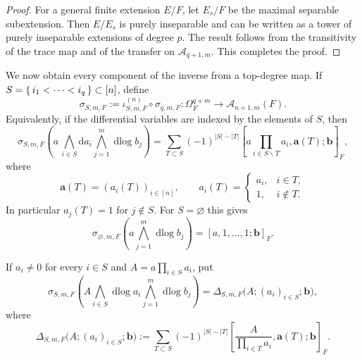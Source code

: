 \documentclass[a4paper,12pt,reqno]{amsart}
\numberwithin{equation}{section}
\theoremstyle{definition}
\DeclareMathOperator{\dlog}{dlog}
\renewcommand{\d}{\mathrm{d}}
\newcommand{\Acal}{\mathcal{A}}
\newcommand{\va}{\mathbf{a}}
\newcommand{\vb}{\mathbf{b}}
\begin{document}
\begin{proof}
    For a general finite extension $E/F$, let $E_s/F$ be the maximal
separable subextension.  Then $E/E_s$ is purely inseparable and can
be written as a tower of purely inseparable extensions of degree $p$.
The result follows from the transitivity of the trace map 
and of the transfer on $\Acal_{q+1,m}$.
    This completes the proof.
\end{proof}



We now obtain every component of the inverse from a top-degree map.  If
$S=\set{i_1<\cdots<i_q}\subset[n]$, define
\begin{equation}\label{eq:sigma}
 \sigma_{S,m,F}:=
 \iota^{(n)}_{S,m,F}\circ \sigma_{q,m,F}:
 \Omega_F^{q+m}\to\Acal_{n+1,m}(F).
\end{equation}
Equivalently, if the differential variables are indexed by the elements of
$S$, then
\begin{equation}\label{eq:sigexp}
 \sigma_{S,m,F}
 \left(a\,\bigwedge_{i\in S}\d a_i\bigwedge_{j=1}^m \dlog b_j\right)
 =\sum_{T\subset S}(-1)^{|S|-|T|}
 \left[
 a\prod_{i\in S\smallsetminus T}a_i,
 \va(T);\vb
 \right]_F,
\end{equation}
where 
\[
 \va(T)=(a_i(T))_{i\in[n]},
 \qquad
 a_i(T)=
 \begin{cases}
 a_i,&i\in T,\\
 1,&i\notin T.
 \end{cases}
\]
In particular
$a_j(T)=1$ for $j\notin S$.  For $S=\varnothing$ this gives
\[
 \sigma_{\varnothing,m,F}
 \left(
 a\bigwedge_{j=1}^m\dlog b_j
 \right)
 =
 [a,1,\ldots,1;\vb]_F.
\]

If $a_i\neq0$ for every $i\in S$ and
$A=a\prod_{i\in S}a_i$,
put
\begin{equation}\label{eq:delta}
 \sigma_{S,m,F}
 \left(
 A\bigwedge_{i\in S}\dlog a_i
 \bigwedge_{j=1}^m\dlog b_j
 \right)
 =
 \Delta_{S,m,F}
 \bigl(A;(a_i)_{i\in S};\vb\bigr),
\end{equation}
where
\begin{equation}\label{eq:deldef}
 \Delta_{S,m,F}
 \bigl(A;(a_i)_{i\in S};\vb\bigr)
 :=
 \sum_{T\subset S}(-1)^{|S|-|T|}
 \left[
 \frac{A}{\prod_{i\in T}a_i},
 \va(T);\vb
 \right]_F.
\end{equation}
\end{document}
